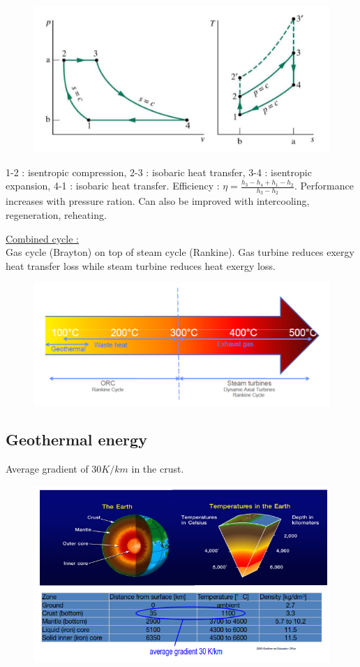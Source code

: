 \documentclass[../main.tex]{subfiles}
\begin{document}
\begin{itemize}
\begin{figure}[hbt!]
        \centering
        \includegraphics[width=0.5\linewidth]{IMAGES/Renewable/Screenshot from 2025-02-25 22-04-31.png}
    \end{figure}
    1-2 : isentropic compression, 2-3 : isobaric heat transfer, 3-4 : isentropic expansion, 4-1 : isobaric heat transfer. Efficiency : $\eta = \frac{h_3-h_4+h_1-h_2}{h_3-h_2}$. Performance increases with pressure ration. Can also be improved with intercooling, regeneration, reheating. 
\end{itemize}

\quad \underline{Combined cycle :}\\
Gas cycle (Brayton) on top of steam cycle (Rankine). Gas turbine reduces exergy heat transfer loss while steam turbine reduces heat exergy loss. \\

\begin{figure}[hbt!]
    \centering
    \includegraphics[width=0.8\linewidth]{IMAGES/Renewable/Screenshot from 2025-02-26 00-40-53.png}
\end{figure}

\subsection{Geothermal energy}
Average gradient of $30K/km$ in the crust. 

\begin{figure}[hbt!]
    \centering
    \includegraphics[width=0.5\linewidth]{IMAGES/Renewable/Screenshot from 2025-03-04 21-24-14.png}
\end{figure}
\end{document}
